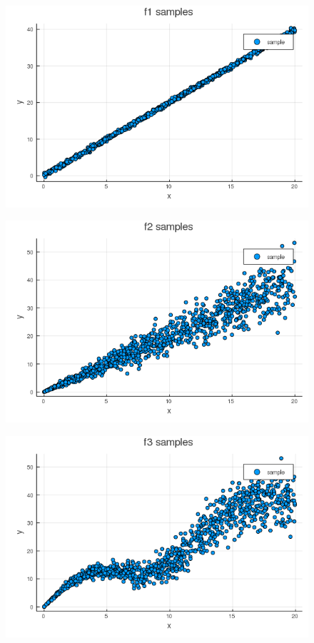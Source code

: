 \documentclass[12pt,letter]{article}
\begin{document}
\begin{enumerate}
  \begin{figure}[h]
    \centering
    \includegraphics[width=12cm,keepaspectratio]{imgs/2_2_2_1.png}
  \end{figure}

  \begin{figure}[h]
    \centering
    \includegraphics[width=12cm,keepaspectratio]{imgs/2_2_2_2.png}
  \end{figure}

    \begin{figure}[h]
    \centering
    \includegraphics[width=12cm,keepaspectratio]{imgs/2_2_2_3.png}
  \end{figure}
  
\end{enumerate}
\end{document}
